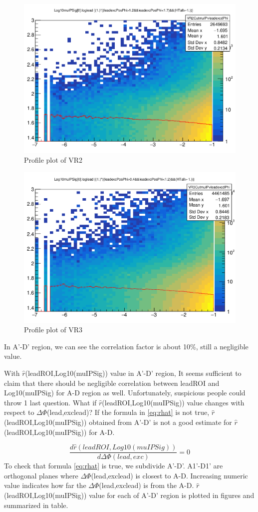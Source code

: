 \begin{figure}[h!]
  \caption{Profile plot of VR2}
  \label{fig:valcar2}
  \centering
  \includegraphics[width=0.65\linewidth]{figs/VR2.png}

\end{figure}

\begin{figure}[h!]
  \caption{Profile plot of VR3}
  \label{fig:valcar3}
  \centering
  \includegraphics[width=0.65\linewidth]{figs/VR3.png}

\end{figure}
In A'-D' region, we can see the correlation factor is about 10\%, still a negligible value. 


With $\hat{r}$(leadROI,Log10(muIPSig)) value in A'-D' region, It seems sufficient to claim that there should be negligible correlation between leadROI and Log10(muIPSig) for A-D region as well.
Unfortunately, suspicious people could throw 1 last question.
What if $\hat{r}$(leadROI,Log10(muIPSig)) value changes with respect to $\Delta\Phi$(lead,exclead)?
If the formula in \ref{eq:rhat} is not true, $\hat{r}$(leadROI,Log10(muIPSig)) obtained from A'-D' is not a good estimate for $\hat{r}$(leadROI,Log10(muIPSig)) for A-D.

\begin{equation}
\label{eq:rhat}
	\frac{d\hat{r}(leadROI,Log10(muIPSig))}{d\Delta\Phi(lead,exc)}=0
\end{equation}
To check that formula \ref{eq:rhat} is true, we subdivide A'-D'.
A1'-D1' are orthogonal planes where $\Delta\Phi$(lead,exclead) is closest to A-D.
Increasing numeric value indicates how far the $\Delta\Phi$(lead,exclead) is from the A-D.
$\hat{r}$(leadROI,Log10(muIPSig)) value for each of A'-D' region is plotted in figures and summarized in table.



